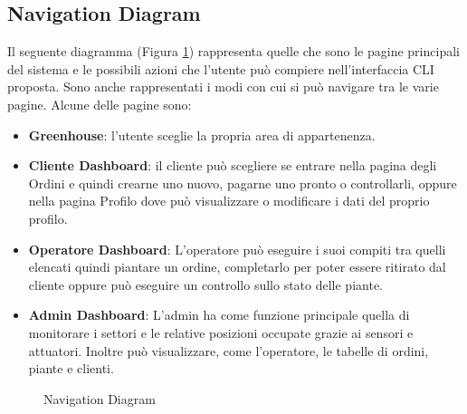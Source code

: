 \documentclass{article}
\begin{document}
\subsection{Navigation Diagram}
\label{subsec:nav-diagram}
Il seguente diagramma (Figura \ref{fig:diagram_navigation}) rappresenta quelle che sono le pagine principali del sistema e le possibili azioni che l’utente può compiere nell'interfaccia CLI proposta. Sono anche rappresentati i modi con cui si può navigare tra le varie pagine.
Alcune delle pagine sono:
\begin{itemize}
    \item \textbf{Greenhouse}: l'utente sceglie la propria area di appartenenza.
    \item \textbf{Cliente Dashboard}: il cliente può scegliere se entrare nella pagina degli Ordini e quindi crearne uno nuovo, pagarne uno pronto o controllarli, oppure nella pagina Profilo dove può visualizzare o modificare i dati del proprio profilo.
    \item \textbf{Operatore Dashboard}: L'operatore può eseguire i suoi compiti tra quelli elencati quindi piantare un ordine, completarlo per poter essere ritirato dal cliente oppure può eseguire un controllo sullo stato delle piante.
    \item \textbf{Admin Dashboard}: L'admin ha come funzione principale quella di monitorare i settori e le relative posizioni occupate grazie ai sensori e attuatori. Inoltre può visualizzare, come l'operatore, le tabelle di ordini, piante e clienti.
\end{itemize}
\begin{figure}[H]
    \centering
    \caption{Navigation Diagram}
    \label{fig:diagram_navigation}
\end{figure}
\end{document}
